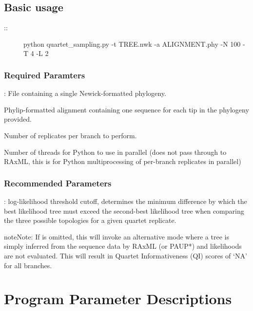 \documentclass[letterpaper,12pt,english]{sphinxmanual}
\begin{document}
\section{Basic usage}
\label{\detokenize{intro:basic-usage}}\begin{description}
\item[{::}] \leavevmode
python quartet\_sampling.py -t TREE.nwk -a ALIGNMENT.phy -N 100 -T 4 -L 2

\end{description}


\subsection{Required Paramters}
\label{\detokenize{intro:required-paramters}}
: File containing a single Newick-formatted phylogeny.

 Phylip-formatted alignment containing one sequence for each tip in the phylogeny provided.

 Number of replicates per branch to perform.

 Number of threads for Python to use in parallel (does not pass through to RAxML, this is for Python multiprocessing of per-branch replicates in parallel)


\subsection{Recommended Parameters}
\label{\detokenize{intro:recommended-parameters}}
: log-likelihood threshold cutoff, determines the minimum difference by which the best likelihood tree must exceed the second-best likelihood tree when comparing the three possible topologies for a given quartet replicate.

\begin{sphinxadmonition}{note}{Note:}
If  is omitted, this will invoke an alternative mode where a tree is simply inferred from the sequence data by RAxML (or PAUP*) and likelihoods are not evaluated.  This will result in Quartet Informativeness (QI) scores of ‘NA’ for all branches.
\end{sphinxadmonition}


\chapter{Program Parameter Descriptions}
\label{\detokenize{prog_desc::doc}}\label{\detokenize{prog_desc:program-parameter-descriptions}}
\end{document}
